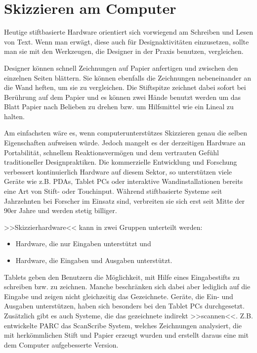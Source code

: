 \medskip 

\section{Skizzieren am Computer} 

Heutige stiftbasierte Hardware orientiert sich vorwiegend am Schreiben und Lesen von Text. Wenn man erwägt, diese auch für Designaktivitäten einzusetzen, sollte man sie mit den Werkzeugen, die Designer in der Praxis benutzen, vergleichen. 

Designer können schnell Zeichnungen auf Papier anfertigen und zwischen den einzelnen Seiten blättern. Sie können ebenfalls die Zeichnungen nebeneinander an die Wand heften, um sie zu vergleichen. Die Stiftspitze zeichnet dabei sofort bei Berührung auf dem Papier und es können zwei Hände benutzt werden um das Blatt Papier nach Belieben zu drehen bzw. um Hilfsmittel wie ein Lineal zu halten.

\medskip Am einfachsten wäre es, wenn computerunterstützes Skizzieren genau die selben Eigenschaften aufweisen würde. Jedoch mangelt es der derzeitigen Hardware an Portabilität, schnellem Reaktionsvermögen und dem vertrauten Gefühl traditioneller Designpraktiken. Die kommerzielle Entwicklung und Forschung verbessert kontinuierlich Hardware auf diesem Sektor, so unterstützen viele Geräte wie z.B. PDAs, Tablet PCs oder interaktive Wandinstallationen bereits eine Art von Stift- oder Touchinput. Während stiftbasierte Systeme seit Jahrzehnten bei Forscher im Einsatz sind, verbreiten sie sich erst seit Mitte der 90er Jahre und werden stetig billiger.

\medskip >>Skizzierhardware<< kann in zwei Gruppen unterteilt werden: 
\begin{itemize}
	\item{Hardware, die nur Eingaben unterstützt und}
	\item{Hardware, die Eingaben und Ausgaben unterstützt.}
\end{itemize}

Tablets geben den Benutzern die Möglichkeit, mit Hilfe eines Eingabestifts zu schreiben bzw. zu zeichnen. Manche beschränken sich dabei aber lediglich auf die Eingabe und zeigen nicht gleichzeitig das Gezeichnete. Geräte, die Ein- und Ausgaben unterstützen, haben sich besonders bei den Tablet PCs durchgesetzt. Zusätzlich gibt es auch Systeme, die das gezeichnete indirekt >>scannen<<. Z.B. entwickelte PARC das ScanScribe System, welches Zeichnungen analysiert, die mit herkömmlichen Stift und Papier erzeugt wurden und erstellt daraus eine mit dem Computer aufgebesserte Version. \citep{Johnson:2009}

